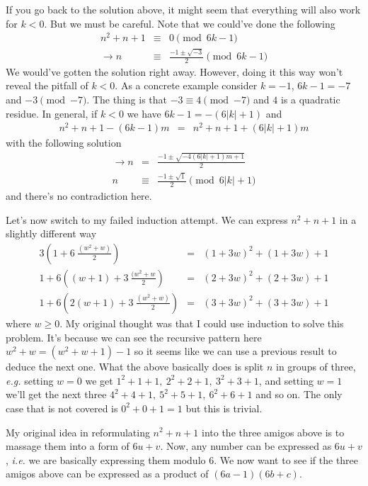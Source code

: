 \documentclass[aps,preprint,preprintnumbers,nofootinbib,showpacs,prd]{revtex4-1}
\newcommand{\ie}{{\it i.e.} }
\newcommand{\eg}{{\it e.g.} }
\newcommand{\nbea}{\begin{eqnarray*}}
\newcommand{\neea}{\end{eqnarray*}}
\begin{document}
If you go back to the solution above, it might seem that everything will also work for $k<0$. But we must be careful. Note that we could've done the following
%
\nbea
n^2 + n + 1 & \equiv & 0 \pmod{6k - 1} \\
\to n & \equiv & \frac{-1 \pm \sqrt{-3}}{2} \pmod{6k - 1}
\neea
%
We would've gotten the solution right away. However, doing it this way won't reveal the pitfall of $k < 0$. As a concrete example consider $k=-1$, $6k-1 = -7$ and $-3 \pmod{-7}$. The thing is that $-3 \equiv 4 \pmod{-7}$ and $4$ is a quadratic residue. In general, if $k<0$ we have $6k - 1 = -(6|k| + 1)$ and
%
\nbea
n^2 + n + 1 - (6k - 1)m & = & n^2 + n + 1 + (6|k| + 1)m
\neea
%
with the following solution
%
\nbea
\to n & = & \frac{-1 \pm \sqrt{-4(6|k|+1)m+1}}{2} \\
n & \equiv & \frac{-1 \pm \sqrt{1}}{2} \pmod{6|k|+1}
\neea
%
and there's no contradiction here.

Let's now switch to my failed induction attempt. We can express $n^2 + n + 1$ in a slightly different way
%
\nbea
3\left ( 1 + 6 ~ \frac{(w^2+w)}{2} \right) & = & (1+3w)^2 + (1+3w) + 1 \\
1 + 6 \left ( (w + 1) +3 ~ \frac{(w^2+w}{2} \right) & = & (2+3w)^2 + (2+3w) + 1 \\
1 + 6 \left ( 2(w + 1) +3 ~ \frac{(w^2+w)}{2} \right) & = & (3+3w)^2 + (3+3w) + 1
\neea
%
where $w \ge 0$. My original thought was that I could use induction to solve this problem. It's because we can see the recursive pattern here $w^2 + w = (w^2 + w + 1)- 1$ so it seems like we can use a previous result to deduce the next one. What the above basically does is split $n$ in groups of three, \eg setting $w=0$ we get $1^2 + 1 + 1,~2^2 + 2 + 1,~3^2 + 3 + 1$, and setting $w=1$ we'll get the next three $4^2 + 4 + 1,~5^2 + 5 + 1,~6^2 + 6 + 1$ and so on. The only case that is not covered is $0^2 + 0 + 1 = 1$ but this is trivial.

My original idea in reformulating $n^2 + n + 1$ into the three amigos above is to massage them into a form of $6u + v$. Now, any number can be expressed as $6u + v$, \ie we are basically expressing them modulo 6. We now want to see if the three amigos above can be expressed as a product of $(6a - 1)(6b + c)$.
\end{document}
